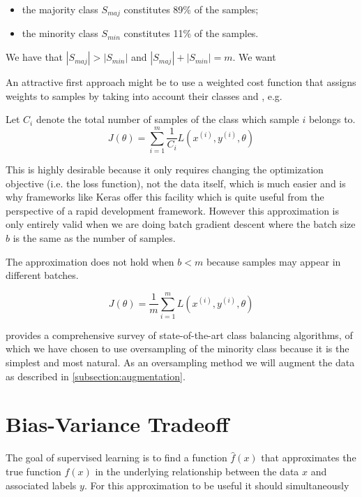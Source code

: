 \begin{itemize}
    \item the majority class $S_{maj}$ constitutes 89\% of the samples;
    \item the minority class $S_{min}$ constitutes 11\% of the samples.
\end{itemize}

We have that $|S_{maj}| > |S_{min}|$ and $|S_{maj}| + |S_{min}| = m$. We want

An attractive first approach might be to use a weighted cost function that assigns weights to samples by taking into account their classes and , e.g.

Let $C_i$ denote the total number of samples of the class which sample $i$ belongs to.
$$
J(\theta) = \sum_{i=1}^{m} \frac{1}{C_i} L(x^{(i)}, y^{(i)}, \theta)
$$

This is highly desirable because it only requires changing the optimization objective (i.e. the loss function), not the data itself, which is much easier and is why frameworks like Keras offer this facility which is quite useful from the perspective of a rapid development framework. However this approximation is only entirely valid when we are doing batch gradient descent where the batch size $b$ is the same as the number of samples.


The approximation does not hold when $b < m$ because samples may appear in different batches.

$$
J(\theta) = \frac{1}{m} \sum_{i=1}^{m} L(x^{(i)}, y^{(i)}, \theta)
$$

\cite{haibo2009} provides a comprehensive survey of state-of-the-art class balancing algorithms, of which we have chosen to use oversampling of the minority class because it is the simplest and most natural. As an oversampling method we will augment the data as described in \ref{subsection:augmentation}.

\section{Bias-Variance Tradeoff}

The goal of supervised learning is to find a function $\hat{f}(x)$ that approximates the true function $f(x)$ in the underlying relationship between the data $x$ and associated labels $y$. For this approximation to be useful it should simultaneously

